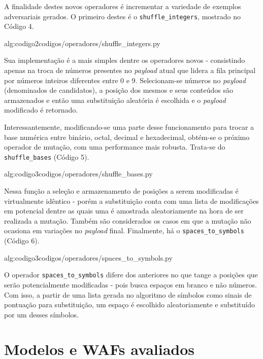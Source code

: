 A finalidade destes novos operadores é incrementar a variedade de exemplos adversariais gerados. O primeiro destes é o \verb+shuffle_integers+, mostrado no Código 4.

\label{sec:codigos}
 {alg:codigo2}{codigos/operadores/shuffle_integers.py}

\bigskip

Sua implementação é a mais simples dentre os operadores novos - consistindo apenas na troca de números presentes no \textit{payload} atual que lidera a fila principal por números inteiros diferentes entre 0 e 9. Selecionam-se números no \textit{payload} (denominados de candidatos), a posição dos mesmos e seus conteúdos são armazenados e então uma substituição aleatória é escolhida e o \textit{payload} modificado é retornado.  

Interessantemente, modificando-se uma parte desse funcionamento para trocar a base numérica entre binário, octal, decimal e hexadecimal, obtém-se o próximo operador de mutação, com uma performance mais robusta. Trata-se do \verb+shuffle_bases+ (Código 5).

\label{sec:codigos}
 {alg:codigo3}{codigos/operadores/shuffle_bases.py}

\bigskip

Nessa função a seleção e armazenamento de posições a serem modificadas é virtualmente idêntico - porém a substituição conta com uma lista de modificações em potencial dentre as quais uma é amostrada aleatoriamente na hora de ser realizada a mutação. Também são considerados os casos em que a mutação não ocasiona em variações no \textit{payload} final. Finalmente, há o \verb+spaces_to_symbols+ (Código 6).

\label{sec:codigos}
 {alg:codigo3}{codigos/operadores/spaces_to_symbols.py}

\bigskip

O operador \verb+spaces_to_symbols+ difere dos anteriores no que tange a posições que serão potencialmente modificadas - pois busca espaços em branco e não números. Com isso, a partir de uma lista gerada no algoritmo de símbolos como sinais de pontuação para substituição, um espaço é escolhido aleatoriamente e substituído por um desses símbolos.

\bigskip

\section{Modelos e WAFs avaliados}

